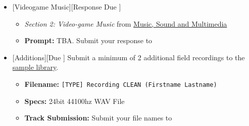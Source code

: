 \begin{itemize}[noitemsep,topsep=0pt,leftmargin=*]
\item {}[Videogame Music][Response Due \dMon]
\begin{itemize}
	\item \emph{Section 2: Video-game Music} from \href{supplements/Music_Sound_and_Multimedia_-_From_the_Live_to_the_Virtual_(Music_and_the_Moving_Image)_(2008).pdf}{Music, Sound and Multimedia}
	\item \textbf{Prompt:} TBA. Submit your response to \discordR
\end{itemize}
\item {}[Additions][Due \dSun] \newline 
 Submit a minimum of 2 additional field recordings to the \href{\#}{sample library}.
\begin{itemize}
	\item \textbf{Filename:} \texttt{[TYPE] Recording CLEAN (Firstname Lastname)}
	\item \textbf{Specs:} 24bit 44100hz WAV File
	\item \textbf{Track Submission:} Submit your file names to \discordS
\end{itemize}
\end{itemize}